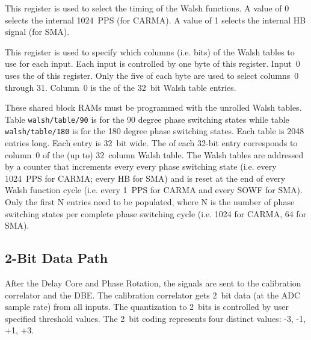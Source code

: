 \documentclass[12pt]{article}
\begin{document}
\begin{description}

 This register is used to select the timing of the Walsh functions.  A value of 0 selects the internal 1024~PPS (for CARMA).  A value of 1 selects the internal HB signal (for SMA).

\end{description}

\begin{description}

 This register is used to specify which columns (i.e. bits)
of the Walsh tables to use for each input.  Each input is controlled by one
byte of this register.  Input~0 uses the \LSB of this register.  Only the five
\LSbs of each byte are used to select columns~0 through 31.  Column~0 is the
\MSb of the 32~bit Walsh table entries.

\end{description}

\begin{description}

  These shared block RAMs must be
programmed with the unrolled Walsh tables.  Table \verb|walsh/table/90| is for
the 90 degree phase switching states while table \verb|walsh/table/180| is for
the 180 degree phase switching states.  Each table is 2048 entries long.  Each
entry is 32~bit wide.  The \MSb of each 32-bit entry corresponds to column~0 of
the (up to) 32~column Walsh table.  The Walsh tables are addressed by a counter
that increments every every phase switching state (i.e. every 1024~PPS for
CARMA; every HB for SMA) and is reset at the end of every Walsh function cycle
(i.e. every 1~PPS for CARMA and every SOWF for SMA).  Only the first N entries
need to be populated, where N is the number of phase switching states per
complete phase switching cycle (i.e. 1024 for CARMA, 64 for SMA).

\end{description}

  \subsection{2-Bit Data Path}

After the Delay Core and Phase Rotation, the signals are sent to the
calibration correlator and the DBE.  The calibration correlator gets 2~bit data
(at the ADC sample rate) from all inputs.  The quantization to 2~bits is
controlled by user specified threshold values.  The 2~bit coding represents
four distinct values: -3, -1, +1, +3.
\end{document}
